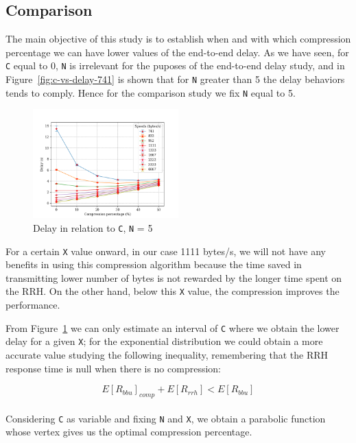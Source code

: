 \documentclass[11pt,a4paper,oneside, openright]{article}
\begin{document}
\subsection{Comparison}

The main objective of this study is to establish when and with which compression percentage we can have lower values of the end-to-end delay. As we have seen, for \texttt{C} equal to 0, \texttt{N} is irrelevant for the puposes of the end-to-end delay study, and in Figure~\ref{fig:c-vs-delay-741} is shown that for \texttt{N} greater than 5 the delay behaviors tends to comply. Hence for the comparison study we fix \texttt{N} equal to 5. 

\begin{figure}[h]
	\centering
	\includegraphics[width=0.5\textwidth]{images/c-vs-delay-comparison}
	\caption{Delay in relation to \texttt{C}, \texttt{N} = 5} 
	\label{fig:c-vs-delay-comparison}
\end{figure}

For a certain \texttt{X} value onward, in our case 1111 bytes/s, we will not have any benefits in using this compression algorithm because the time saved in transmitting lower number of bytes is not rewarded by the longer time spent on the RRH.
On the other hand, below this \texttt{X} value, the compression improves the performance. 

From Figure~\ref{fig:c-vs-delay-comparison} we can only estimate an interval of \texttt{C} where we obtain the lower delay for a given \texttt{X}; for the exponential distribution we could obtain a more accurate value studying the following inequality, remembering that the RRH response time is null when there is no compression:

\begin{equation} \label{eq:inequality}
E[R_{bbu}]_{comp} + E[R_{rrh}] < E[R_{bbu}]
\end{equation}
\\
Considering \texttt{C} as variable and fixing \texttt{N} and \texttt{X}, we obtain a parabolic function whose vertex gives us the optimal compression percentage.
\end{document}
